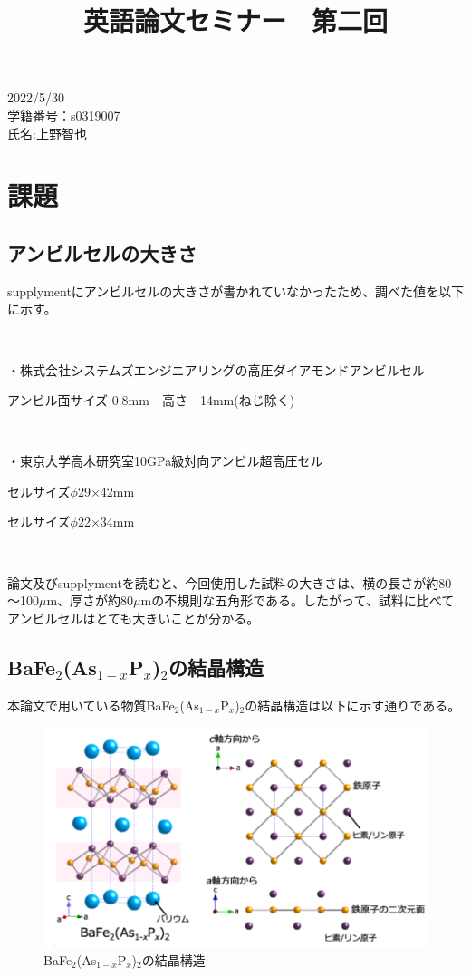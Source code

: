 \documentclass[dvipdfmx]{jsarticle}
\begin{document}
\title{\huge 英語論文セミナー　第二回}
\date{}
\maketitle

\begin{flushright}
2022/5/30\\
学籍番号：s0319007\\
氏名:上野智也\\
\end{flushright}

\section{課題}

\subsection{アンビルセルの大きさ}

supplymentにアンビルセルの大きさが書かれていなかったため、調べた値を以下に示す。

　　

・株式会社システムズエンジニアリングの高圧ダイアモンドアンビルセル

アンビル面サイズ 0.8mm　高さ　14mm(ねじ除く)

　　

・東京大学高木研究室10GPa級対向アンビル超高圧セル

セルサイズ$\phi$29$\times$42mm

セルサイズ$\phi$22$\times$34mm

　　

論文及びsupplymentを読むと、今回使用した試料の大きさは、横の長さが約80～100$\mu$m、厚さが約80$\mu$mの不規則な五角形である。したがって、試料に比べてアンビルセルはとても大きいことが分かる。

\newpage

\subsection{BaFe$_2$(As$_{1-x}$P$_x$)$_2$の結晶構造}

本論文で用いている物質BaFe$_2$(As$_{1-x}$P$_x$)$_2$の結晶構造は以下に示す通りである。

\begin{figure}[h]
\centering
\includegraphics[width=13cm]{structure.png}
\caption{BaFe$_2$(As$_{1-x}$P$_x$)$_2$の結晶構造}
\end{figure}%
\end{document}
